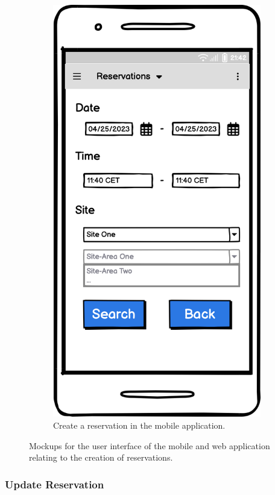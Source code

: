 \begin{figure}[h]
\begin{subfigure}[c]{0.3\textwidth}
        \includegraphics[width=\textwidth,height=1.6\textwidth,keepaspectratio]{resources/images/main/5_design/mockups/create_reservation/mobile/Create_Reservation.png}
        \caption{Create a reservation in the mobile application.}
        \label{fig:mobile-create-reservation}
    \end{subfigure}
    \caption{Mockups for the user interface of the mobile and web application relating to the creation of reservations.}
    \label{fig:mockups-create-reservation}
\end{figure}

\newpage

\subsubsection{Update Reservation}
\label{ch:Design:sec:Reservation System:ssec:Management Capabilities:sssec:Update Reservation}

